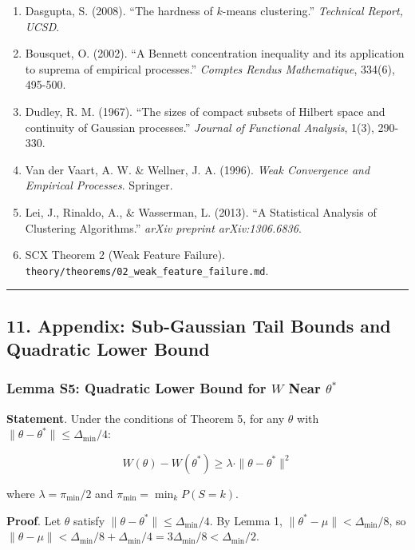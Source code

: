 \documentclass[
  12pt,
]{article}
\begin{document}
\begin{enumerate}
{  Learning}, 75(2), 245-248.
\item
  Dasgupta, S. (2008). ``The hardness of \(k\)-means clustering.''
  \emph{Technical Report, UCSD}.
\item
  Bousquet, O. (2002). ``A Bennett concentration inequality and its
  application to suprema of empirical processes.'' \emph{Comptes Rendus
  Mathematique}, 334(6), 495-500.
\item
  Dudley, R. M. (1967). ``The sizes of compact subsets of Hilbert space
  and continuity of Gaussian processes.'' \emph{Journal of Functional
  Analysis}, 1(3), 290-330.
\item
  Van der Vaart, A. W. \& Wellner, J. A. (1996). \emph{Weak Convergence
  and Empirical Processes}. Springer.
\item
  Lei, J., Rinaldo, A., \& Wasserman, L. (2013). ``A Statistical
  Analysis of Clustering Algorithms.'' \emph{arXiv preprint
  arXiv:1306.6836}.
\item
  SCX Theorem 2 (Weak Feature Failure).
  \texttt{theory/theorems/02\_weak\_feature\_failure.md}.
\end{enumerate}

\begin{center}\rule{0.5\linewidth}{0.5pt}\end{center}

\subsection{11. Appendix: Sub-Gaussian Tail Bounds and Quadratic Lower
Bound}\label{appendix-sub-gaussian-tail-bounds-and-quadratic-lower-bound}

\subsubsection{\texorpdfstring{Lemma S5: Quadratic Lower Bound for \(W\)
Near
\(\theta^*\)}{Lemma S5: Quadratic Lower Bound for W Near \textbackslash theta\^{}*}}\label{lemma-s5-quadratic-lower-bound-for-w-near-theta}

\textbf{Statement}. Under the conditions of Theorem 5, for any
\(\theta\) with \(\|\theta - \theta^*\| \leq \Delta_{\min}/4\):

\[W(\theta) - W(\theta^*) \geq \lambda \cdot \|\theta - \theta^*\|^2\]

where \(\lambda = \pi_{\min} / 2\) and \(\pi_{\min} = \min_k P(S = k)\).

\textbf{Proof}. Let \(\theta\) satisfy
\(\|\theta - \theta^*\| \leq \Delta_{\min}/4\). By Lemma 1,
\(\|\theta^* - \mu\| < \Delta_{\min}/8\), so
\(\|\theta - \mu\| < \Delta_{\min}/8 + \Delta_{\min}/4 = 3\Delta_{\min}/8 < \Delta_{\min}/2\).
\end{document}
